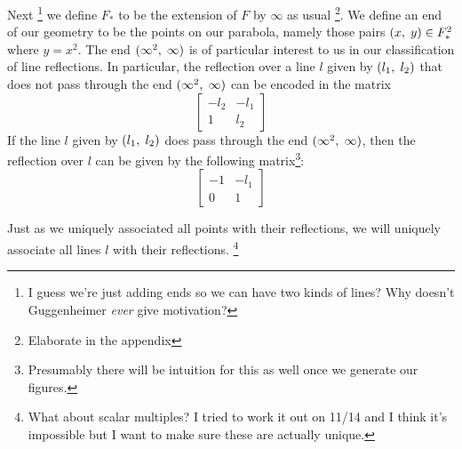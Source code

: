 \documentclass[12pt]{article}
\newcommand{\ttc}{, \hspace{1mm}}
\newcommand{\linenoendmat}[2]{\begin{bmatrix} -{#2} & -{#1} \\ 1 & {#2} \end{bmatrix}}
\newcommand{\stanlinenoendmat}{\linenoendmat{l_1}{l_2}}
\newcommand{\lineendmat}[2]{\begin{bmatrix} -1 & -{#1} \\ 0 & 1 \end{bmatrix}}
\newcommand{\stanlineendmat}{\lineendmat{l_1}{l_2}}
\newcommand{\specialend}{(\infty^2\ttc\infty)}
\begin{document}
Next \footnote{I guess we're just adding ends so we can have two kinds of lines? Why doesn't Guggenheimer \textit{ever} give motivation?} we define $F_*$ to be the extension of $F$ by $\infty$ as usual \footnote{Elaborate in the appendix}. We define an end of our geometry to be the points on our parabola, namely those pairs $(x \ttc y) \in F_*^2$ where $y = x^2$. The end $\specialend$ is of particular interest to us in our classification of line reflections. In particular, the reflection over a line $l$ given by $(l_1\ttc l_2)$ that does not pass through the end $\specialend$ can be encoded in the matrix
\[\stanlinenoendmat\]
If the line $l$ given by $(l_1\ttc l_2)$ does pass through the end $\specialend$, then the reflection over $l$ can be given by the following matrix\footnote{Presumably there will be intuition for this as well once we generate our figures.}:
\[
	\stanlineendmat
\]

Just as we uniquely associated all points with their reflections, we will uniquely associate all lines $l$ with their reflections. \footnote{What about scalar multiples? I tried to work it out on 11/14 and I think it's impossible  but I want to make sure these are actually unique.} 
\end{document}
